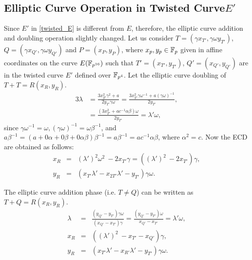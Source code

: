 \subsection{Elliptic Curve Operation in Twisted Curve\texorpdfstring{$E'$}{}}
 Since $E'$ in \eqref{twisted_E} is different from $E$, therefore, the elliptic curve addition and doubling operation slightly changed.
Let us consider  $T=(\gamma x_{T'},\gamma \omega y_{T'})$, $Q=(\gamma x_{Q'}, \gamma \omega y_{Q'})$  and  $P=(x_P,y_P) $, where $x_p, y_p \in {\mathbb{F}}_{p}$ given in affine coordinates on the curve $E(\mathbb{F}_{p^{16}})$ such that $T'=(x_{T'},y_{T'})$, $Q'=(x_{Q'},y_{Q'})$ are in the twisted curve $E'$ defined over $\mathbb{F}_{p^4}$.
Let the elliptic curve doubling of $T+T = R(x_R, y_R)$. 
\begin{alignat}{3}
 \lambda & =  \frac{ 3x_{T'}^2 \gamma^2+a}{2 y_{T'} \gamma \omega} = \frac{ 3x_{T'}^2 \gamma \omega^{-1}+a (\gamma \omega)^{-1} }{2 y_{T'}}, \nonumber \\
 & = \frac{ (3x_{T'}^2 +a c^{-1} \alpha\beta)\omega}{2 y_{T'}} = \lambda' \omega, \nonumber 
 \end{alignat}
since  $\gamma \omega^{-1} = \omega, (\gamma \omega)^{-1} = \omega \beta^{-1}$, and $a \beta^{-1} = (a + 0\alpha + 0 \beta + 0 \alpha \beta) \beta ^{-1}=a \beta^{-1} = ac^{-1} \alpha \beta$, where $\alpha^2=c$.
Now the ECD are obtained as follows:
\begin{eqnarray}
 x_R &=& (\lambda')^2 \omega^2 \ - 2x_{T'}\gamma   = ((\lambda')^2  \ - 2x_{T'})\gamma, \nonumber \\
 y_R &=& (x_{T'}\lambda' -x_{2T'}\lambda'-y_{T'})\gamma \omega \nonumber.
\end{eqnarray}

The elliptic curve addition phase (i.e. $T\neq Q$) can be written as $T+Q = R(x_R, y_R)$.
\begin{eqnarray}
\lambda &=& \frac{( y_{Q'}-y_{T'})\gamma \omega}{( x_{Q'}-x_{T'})\gamma} = \frac{( y_{Q'}-y_{T'}) \omega}{x_{Q'}-x_{T'}} = \lambda' \omega, \nonumber\\
x_{R} & = & ((\lambda')^2  \ - x_{T'} -x_{Q'})\gamma, \nonumber \\
 y_{R} & = &  (x_{T'}\lambda' -x_{R'}\lambda'-y_{T'})\gamma \omega \nonumber.
\end{eqnarray}
